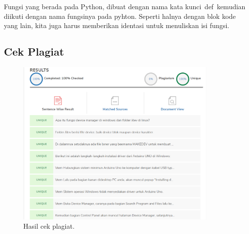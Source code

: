 \hfill \break
Fungsi yang berada pada Python, dibuat dengan nama kata kunci def kemudian diikuti dengan nama fungsinya pada pyhton.
Seperti halnya dengan blok kode yang lain, kita juga harus memberikan identasi untuk menuliskan isi fungsi.

\subsection{Cek Plagiat}
\begin{figure}[H]
	\includegraphics[width=10cm]{figures/5/1174031/Teori/Plagiat.png}
	\centering
	\caption{Hasil cek plagiat.}
\end{figure}

